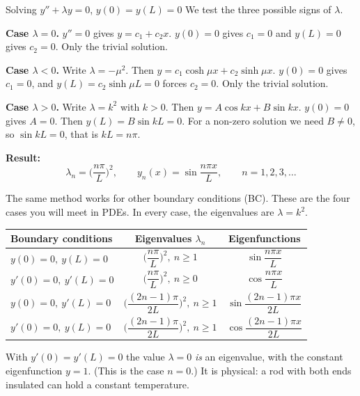 \begin{examplebox}{Solving $y'' + \lambda y = 0$, $y(0)=y(L)=0$}
We test the three possible signs of $\lambda$.

\textbf{Case $\lambda = 0$.} $y'' = 0$ gives $y = c_1 + c_2x$. $y(0)=0$ gives $c_1 = 0$ and $y(L)=0$ gives $c_2 = 0$. Only the trivial solution.

\textbf{Case $\lambda<0$.} Write $\lambda=-\mu^2$. Then $y = c_1\cosh\mu x + c_2\sinh\mu x$. $y(0)=0$ gives $c_1=0$, and $y(L)=c_2\sinh\mu L = 0$ forces $c_2=0$. Only the trivial solution.

\textbf{Case $\lambda>0$.} Write $\lambda=k^2$ with $k>0$. Then $y = A\cos kx + B\sin kx$. $y(0)=0$ gives $A=0$. Then $y(L) = B\sin kL = 0$. For a non-zero solution we need $B\neq0$, so $\sin kL=0$, that is $kL = n\pi$.

\textbf{Result:}
\[ \lambda_n = \Big(\frac{n\pi}{L}\Big)^2, \qquad y_n(x) = \sin\frac{n\pi x}{L}, \qquad n = 1, 2, 3, \dots \]
\end{examplebox}

The same method works for other boundary conditions (BC). These are the four cases you will meet in PDEs. In every case, the eigenvalues are $\lambda = k^2$.

\begin{center}
\renewcommand{\arraystretch}{1.5}
\begin{tabular}{@{}lcc@{}}
\toprule
Boundary conditions & Eigenvalues $\lambda_n$ & Eigenfunctions \\
\midrule
$y(0)=0,\ y(L)=0$ & $\Big(\dfrac{n\pi}{L}\Big)^2,\ n\ge1$ & $\sin\dfrac{n\pi x}{L}$ \\
$y'(0)=0,\ y'(L)=0$ & $\Big(\dfrac{n\pi}{L}\Big)^2,\ n\ge0$ & $\cos\dfrac{n\pi x}{L}$ \\
$y(0)=0,\ y'(L)=0$ & $\Big(\dfrac{(2n-1)\pi}{2L}\Big)^2,\ n\ge1$ & $\sin\dfrac{(2n-1)\pi x}{2L}$ \\
$y'(0)=0,\ y(L)=0$ & $\Big(\dfrac{(2n-1)\pi}{2L}\Big)^2,\ n\ge1$ & $\cos\dfrac{(2n-1)\pi x}{2L}$ \\
\bottomrule
\end{tabular}
\end{center}

\begin{notebox}
With $y'(0)=y'(L)=0$ the value $\lambda=0$ \emph{is} an eigenvalue, with the constant eigenfunction $y=1$. (This is the case $n=0$.) It is physical: a rod with both ends insulated can hold a constant temperature.
\end{notebox}

